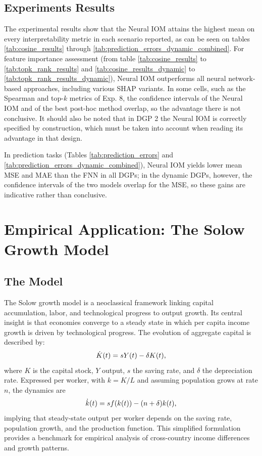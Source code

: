 \documentclass[preprint,12pt,authoryear]{sn-jnl}
\begin{document}
\subsection{Experiments Results}

The experimental results show that the Neural IOM attains the highest mean on every interpretability metric in each scenario reported, as can be seen on tables \ref{tab:cosine_results} through \ref{tab:prediction_errors_dynamic_combined}. For feature importance assessment (from table \ref{tab:cosine_results} to \ref{tab:topk_rank_results} and \ref{tab:cosine_results_dynamic} to \ref{tab:topk_rank_results_dynamic}), Neural IOM outperforms all neural network-based approaches, including various SHAP variants. In some cells, such as the Spearman and top-$k$ metrics of Exp. 8, the confidence intervals of the Neural IOM and of the best post-hoc method overlap, so the advantage there is not conclusive. It should also be noted that in DGP 2 the Neural IOM is correctly specified by construction, which must be taken into account when reading its advantage in that design. 

In prediction tasks (Tables \ref{tab:prediction_errors} and \ref{tab:prediction_errors_dynamic_combined}), Neural IOM yields lower mean MSE and MAE than the FNN in all DGPs; in the dynamic DGPs, however, the confidence intervals of the two models overlap for the MSE, so these gains are indicative rather than conclusive.

\section{Empirical Application: The Solow Growth Model} \label{sec:solow}

\subsection{The Model}


The Solow growth model is a neoclassical framework linking capital accumulation, labor, and technological progress to output growth. Its central insight is that economies converge to a steady state in which per capita income growth is driven by technological progress. The evolution of aggregate capital is described by:
\begin{equation}
\setlength{\abovedisplayskip}{5pt}
\setlength{\belowdisplayskip}{5pt}
\dot{K}(t) = s Y(t) - \delta K(t),
\end{equation}
where $K$ is the capital stock, $Y$ output, $s$ the saving rate, and $\delta$ the depreciation rate. Expressed per worker, with $k = K/L$ and assuming population grows at rate $n$, the dynamics are
\begin{equation}
\setlength{\abovedisplayskip}{5pt}
\setlength{\belowdisplayskip}{5pt}
\dot{k}(t) = s f(k(t)) - (n + \delta) k(t),
\end{equation}
implying that steady-state output per worker depends on the saving rate, population growth, and the production function. This simplified formulation provides a benchmark for empirical analysis of cross-country income differences and growth patterns.
\end{document}

